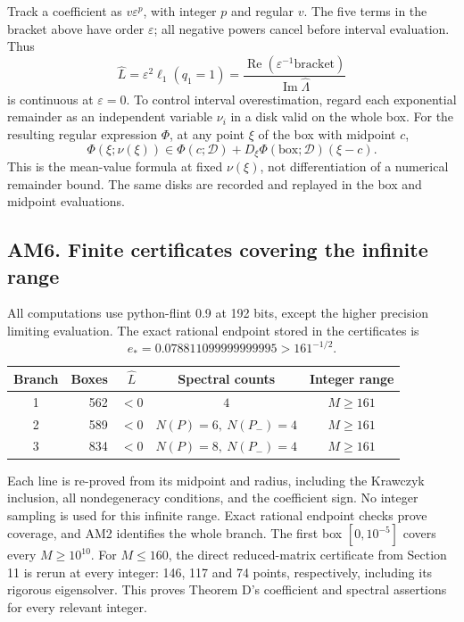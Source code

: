 Track a coefficient as $v\varepsilon^p$, with integer $p$ and regular $v$.
The five terms in the bracket above have order $\varepsilon$; all negative powers cancel
before interval evaluation. Thus
\[
 \widehat L=\varepsilon^2\ell_1(q_1=1)
      =\frac{\operatorname{Re}(\varepsilon^{-1}\text{bracket})}
                   {\operatorname{Im}\widehat\Lambda}
\]
is continuous at $\varepsilon=0$. To control interval overestimation, regard each
exponential remainder as an independent variable $\nu_i$ in a disk valid on the whole box.
For the resulting regular expression $\Phi$, at any point $\xi$ of the box with midpoint $c$,
\[
 \Phi(\xi;\nu(\xi))\in\Phi(c;\mathcal D)
              +D_\xi\Phi(\text{box};\mathcal D)(\xi-c).
\]
This is the mean-value formula at fixed $\nu(\xi)$, not differentiation of a numerical
remainder bound. The same disks are recorded and replayed in the box and midpoint evaluations.

\subsection{AM6. Finite certificates covering the infinite range}
All computations use python-flint 0.9 at 192 bits, except the higher precision limiting
evaluation. The exact rational endpoint stored in the certificates is
\[
 e_*=0.078811099999999995>161^{-1/2}.
\]
\begin{center}
\begin{tabular}{c r c c c}
\toprule
Branch & Boxes & $\widehat L$ & Spectral counts & Integer range\\
\midrule
1 & 562 & $<0$ & $4$ & $M\ge161$\\
2 & 589 & $<0$ & $N(P)=6,\ N(P_-)=4$ & $M\ge161$\\
3 & 834 & $<0$ & $N(P)=8,\ N(P_-)=4$ & $M\ge161$\\
\bottomrule
\end{tabular}
\end{center}
Each line is re-proved from its midpoint and radius, including the Krawczyk inclusion,
all nondegeneracy conditions, and the coefficient sign. No integer sampling is used for
this infinite range. Exact rational endpoint checks prove coverage, and AM2 identifies
the whole branch. The first box $[0,10^{-5}]$ covers every $M\ge10^{10}$.
For $M\le160$, the direct reduced-matrix certificate from Section 11 is rerun at every
integer: 146, 117 and 74 points, respectively, including its rigorous eigensolver.
This proves Theorem D's coefficient and spectral assertions for every relevant integer.

